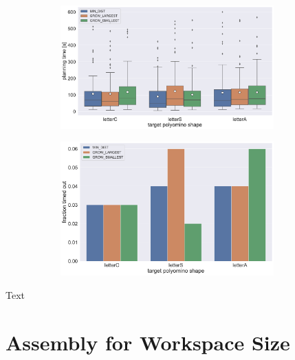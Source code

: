 \begin{figure}
	\centering
	\begin{subfigure}[b]{\textwidth}
		\centering
		\includegraphics[width=0.9\textwidth]{figures/plots/AFTS_sp_time.pdf}
		\caption{}
		\label{fig:AFTS_sp_time}
	\end{subfigure}
	
	\begin{subfigure}[b]{\textwidth}
		\centering
		\includegraphics[width=0.9\textwidth]{figures/plots/AFTS_sp_timeout.pdf}
		\caption{}
		\label{fig:AFTS_sp_timeout}
	\end{subfigure}
	\caption[]{}
	\label{fig:AFTS_sp_timestats}
\end{figure}

Text




\section{Assembly for Workspace Size}
\label{sec:AFBS}

